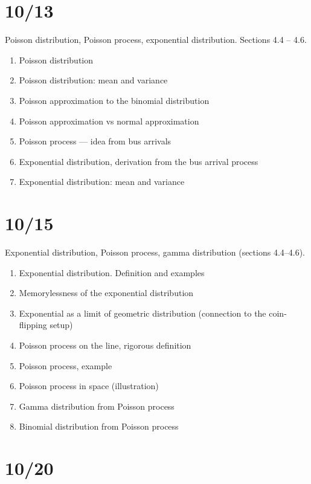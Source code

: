 \documentclass[letterpaper,11pt,oneside,reqno]{amsart}
\numberwithin{equation}{section}
\theoremstyle{definition}
\begin{document}
\section{10/13}

Poisson distribution, Poisson process, exponential distribution.
Sections 4.4 -- 4.6.

\begin{enumerate}
	\item Poisson distribution
	\item Poisson distribution: mean and variance
	\item Poisson approximation to the binomial distribution
	\item Poisson approximation vs normal approximation
	\item Poisson process --- idea from bus arrivals
	\item Exponential distribution, derivation from the bus arrival process
	\item Exponential distribution: mean and variance
\end{enumerate}

\section{10/15}

Exponential distribution, Poisson process, gamma distribution
(sections 4.4--4.6).

\begin{enumerate}
	\item Exponential distribution. Definition and examples
	\item Memorylessness of the exponential distribution
	\item Exponential as a limit of geometric distribution (connection to the coin-flipping setup)
	\item Poisson process on the line, rigorous definition
	\item Poisson process, example
	\item Poisson process in space (illustration)
	\item Gamma distribution from Poisson process
	\item Binomial distribution from Poisson process
\end{enumerate}

\section{10/20}
\end{document}
